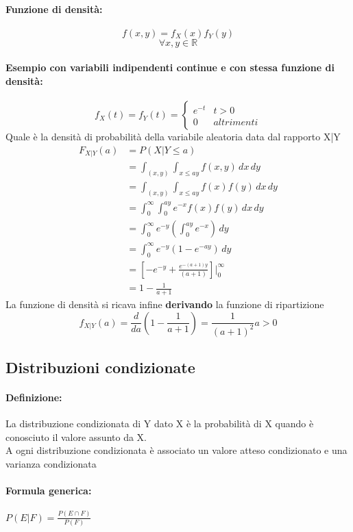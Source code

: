 \documentclass[]{article}
\newcommand{\definizione}{\paragraph{Definizione:}}
\newcommand{\formula}{\paragraph{Formula generica:}}
\begin{document}
    \paragraph{Funzione di densità:}
    \[ f(x, y) = f_X(x) f_Y(y)\]
    \[ \forall x,y \in \mathbb{R} \]
    
    \paragraph{Esempio con variabili indipendenti continue e con stessa funzione di densità:}
    \begin{equation*}
        f_X(t) = f_Y(t) =
        \begin{cases}
            e^{-t} & t > 0 \\
            0 & altrimenti
        \end{cases}
    \end{equation*}
    Quale è la densità di probabilità della variabile aleatoria data dal rapporto X|Y
    \begin{equation*}
    \begin{split}
        F_{X|Y}(a) & = P(X | Y \leq a) \\
        & = \int_{(x,y)}^{}\int_{x \leq ay}^{} f(x, y) \, dx \, dy \\ 
        & = \int_{(x,y)}^{}\int_{x \leq ay}^{} f(x) f(y) \, dx \, dy \\ 
        & = \int_{0}^{\infty} \int_{0}^{ay} e^{-x} f(x) f(y)\, dx \, dy \\ 
        & = \int_{0}^{\infty} e^{-y}(\int_{0}^{ay} e^{-x}) \, dy \\
        & = \int_{0}^{\infty} e^{-y} (1-e^{-ay}) \, dy \\ 
        & = [-e^{-y} + \frac{e^{-(a+1)y}}{(a+1)}] \bigg\rvert_{0}^{\infty} \\ 
        & =  1 - \frac{1}{a+1} 
    \end{split}
    \end{equation*}
    La funzione di densità si ricava infine \textbf{derivando} la funzione di ripartizione
    \[f_{X|Y}(a) = \frac{d}{da}(1- \frac{1}{a + 1}) = \frac{1}{(a + 1)^2} a > 0 \]

    \newpage
    \subsection{Distribuzioni condizionate}
    \definizione La distribuzione condizionata di Y dato X è la probabilità di X quando è conosciuto il valore assunto da X. \\
    A ogni distribuzione condizionata è associato un valore atteso condizionato e una varianza condizionata
    \formula $P(E|F) = \frac{P(E \cap F)}{P(F)}$
\end{document}
